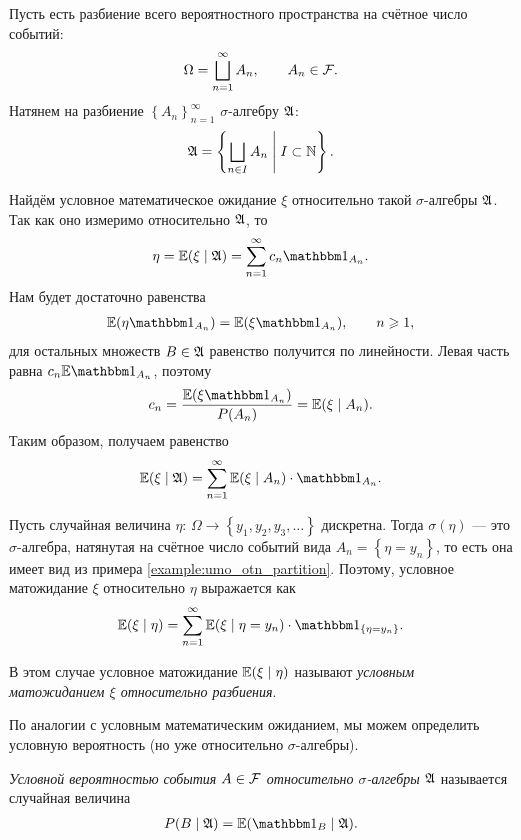 \documentclass[../main.tex]{subfiles}
\begin{document}
\begin{exmpl}
 \label{example:umo_otn_partition}
 Пусть есть разбиение всего вероятностного пространства на счётное число событий:
 \begin{align*}
  \Omega = \bigsqcup_{n=1}^{\infty} A_n, \qquad A_n \in \mathcal F.
 \end{align*} Натянем на разбиение $ \left\{A_n \right\}_{n=1}^{\infty} $ $ \sigma $-алгебру $ \mathfrak A $:
 \begin{align*}
  \mathfrak A = \left\{ \bigsqcup_{n \in I} A_n \;\middle|\; I \subset \mathbb{N} \right\}.
 \end{align*} 

 Найдём условное математическое ожидание $ \xi $ относительно такой $ \sigma $-алгебры $ \mathfrak A $. Так как оно измеримо относительно $ \mathfrak A $, то
 \begin{align*}
  \eta = \E(\xi \mid \A) = \sum_{n=1}^{\infty} c_n \Ind_{A_n}.
 \end{align*} Нам будет достаточно равенства \begin{align*}
 \E(\eta\Ind_{A_n}) = \E(\xi\Ind_{A_n}), \qquad n \geqslant 1,
 \end{align*} для остальных множеств $ B \in \mathfrak A $ равенство получится по линейности. Левая часть равна $ c_n \E \Ind_{A_n} $, поэтому
 \begin{align*}
  c_n = \frac{\E(\xi \Ind_{A_n})}{P(A_n)} = \E(\xi \mid A_n).
 \end{align*} Таким образом, получаем равенство
 \begin{align*}
  \E(\xi \mid \A) = \sum_{n=1}^{\infty} \E(\xi\mid A_n)  \cdot \Ind_{A_n}.
 \end{align*}
\end{exmpl}

\begin{remrk}
 Пусть случайная величина $ \eta \colon\,\Omega \to \left\{ y_1, y_2, y_3, \ldots \right\} $ дискретна. Тогда $ \sigma(\eta) $ --- это $ \sigma $-алгебра, натянутая на счётное число событий вида $ A_n = \left\{ \eta = y_n \right\} $, то есть она имеет вид из примера \ref{example:umo_otn_partition}. Поэтому, условное матожидание $ \xi $ относительно $ \eta $ выражается как
 \begin{align*}
  \E(\xi \mid \eta) = \sum_{n=1}^{\infty} \E(\xi \mid \eta = y_n) \cdot \Ind_{\left\{ \eta = y_n \right\}}.
 \end{align*}

 В этом случае условное матожидание $ \mathbb E(\xi \mid \eta) $ называют \textit{условным матожиданием $ \xi $ относительно разбиения}.
\end{remrk}

По аналогии с условным математическим ожиданием, мы можем определить условную вероятность (но уже относительно $ \sigma $-алгебры).

\begin{df}
 \textit{Условной вероятностью события $ A \in \mathcal F $ относительно $ \sigma $-алгебры $ \mathfrak A $} называется случайная величина
 \begin{align*}
  P(B \mid \A) = \E(\Ind_B \mid \A).
 \end{align*}
\end{df}
\end{document}
